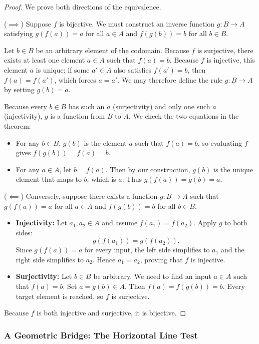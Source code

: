 \begin{proof}
We prove both directions of the equivalence.

($\implies$) Suppose $f$ is bijective. We must construct an inverse function $g: B \to A$ satisfying $g(f(a)) = a$ for all $a \in A$ and $f(g(b)) = b$ for all $b \in B$.

Let $b \in B$ be an arbitrary element of the codomain. Because $f$ is surjective, there exists at least one element $a \in A$ such that $f(a) = b$. Because $f$ is injective, this element $a$ is unique: if some $a' \in A$ also satisfies $f(a') = b$, then $f(a) = f(a')$, which forces $a = a'$. We may therefore define the rule $g: B \to A$ by setting $g(b) = a$. 

Because every $b \in B$ has such an $a$ (surjectivity) and only one such $a$ (injectivity), $g$ is a function from $B$ to $A$. We check the two equations in the theorem:
\begin{itemize}
\item For any $b \in B$, $g(b)$ is the element $a$ such that $f(a) = b$, so evaluating $f$ gives $f(g(b)) = f(a) = b$.
\item For any $a \in A$, let $b = f(a)$. Then by our construction, $g(b)$ is the unique element that maps to $b$, which is $a$. Thus $g(f(a)) = g(b) = a$.
\end{itemize}

($\impliedby$) Conversely, suppose there exists a function $g: B \to A$ such that $g(f(a)) = a$ for all $a \in A$ and $f(g(b)) = b$ for all $b \in B$.
\begin{itemize}
\item \textbf{Injectivity:} Let $a_1, a_2 \in A$ and assume $f(a_1) = f(a_2)$. Apply $g$ to both sides:
\[
g(f(a_1)) = g(f(a_2)).
\]
Since $g(f(a)) = a$ for every input, the left side simplifies to $a_1$ and the right side simplifies to $a_2$. Hence $a_1 = a_2$, proving that $f$ is injective.
\item \textbf{Surjectivity:} Let $b \in B$ be arbitrary. We need to find an input $a \in A$ such that $f(a) = b$. Set $a = g(b) \in A$. Then $f(a) = f(g(b)) = b$. Every target element is reached, so $f$ is surjective.
\end{itemize}
Because $f$ is both injective and surjective, it is bijective.
\end{proof}

\subsubsection{A Geometric Bridge: The Horizontal Line Test}

